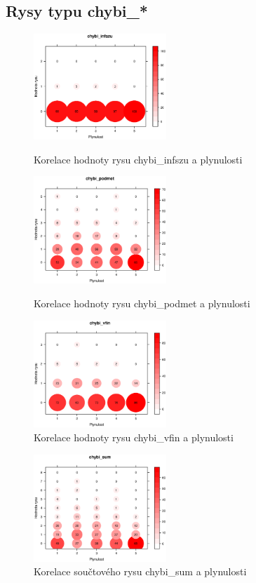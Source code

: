 \documentclass[12pt,a4paper]{report}
\begin{document}
\subsection{Rysy typu chybi\_*}
\begin{figure}[!htb]
  \centering\includegraphics[width=50mm]{./grafy/rysy/chybi_infszu-c.eps}
  \caption{Korelace hodnoty rysu chybi\_infszu a plynulosti}\label{gr:infszu}
\endminipage\hfill
{}
  \centering\includegraphics[width=50mm]{./grafy/rysy/chybi_podmet-c.eps}
  \caption{Korelace hodnoty rysu chybi\_podmet a plynulosti}\label{gr:podmet}
\endminipage\hfill
{}
  \centering\includegraphics[width=50mm]{./grafy/rysy/chybi_vfin-c.eps}
  \caption{Korelace hodnoty rysu chybi\_vfin a plynulosti}\label{gr:vfin}
\endminipage\hfill
\end{figure}

\begin{figure}[!htb]
\centering{}
  \centering\includegraphics[width=50mm]{./grafy/rysy/chybi_sum-c.eps}
  \caption{Korelace součtového rysu chybi\_sum a plynulosti}\label{gr:chybi}
\endminipage
\end{figure}
\end{document}
